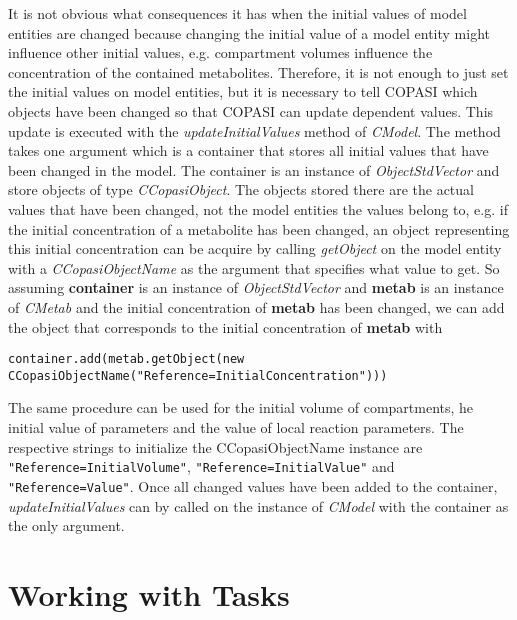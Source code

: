 \documentclass[a4,10pt]{article}
\begin{document}
It is not obvious what consequences it has when the initial values of model entities are changed because changing the initial value of a model entity might influence other initial values, e.g. compartment volumes influence the concentration of the contained metabolites.
Therefore, it is not enough to just set the initial values on model entities, but it is necessary to tell COPASI which objects have been changed so that COPASI can update dependent values.
This update is executed with the \textit{updateInitialValues} method of \textit{CModel}. The method takes one argument which is a container that stores all initial values that have been changed in the model. The container is an instance of \textit{ObjectStdVector} and store objects of type \textit{CCopasiObject}. The objects stored there are the actual values that have been changed, not the model entities the values belong to, e.g. if the initial concentration of a metabolite has been changed, an object representing this initial concentration can be acquire by calling \textit{getObject} on the model entity with a \textit{CCopasiObjectName} as the argument that specifies what value to get.
So assuming \textbf{container} is an instance of \textit{ObjectStdVector} and \textbf{metab} is an instance of \textit{CMetab} and the initial concentration of \textbf{metab} has been changed, we can add the object that corresponds to the initial concentration of \textbf{metab} with
\small{
\begin{verbatim}
container.add(metab.getObject(new CCopasiObjectName("Reference=InitialConcentration")))
\end{verbatim}
}
The same procedure can be used for the initial volume of compartments, he initial value of parameters and the value of local reaction parameters. The respective strings to initialize the CCopasiObjectName instance are \verb$"Reference=InitialVolume"$, \verb$"Reference=InitialValue"$ and \verb$"Reference=Value"$.
Once all changed values have been added to the container, \textit{updateInitialValues} can by called on the instance of \textit{CModel} with the container as the only argument. 



\section{Working with Tasks}
\end{document}
